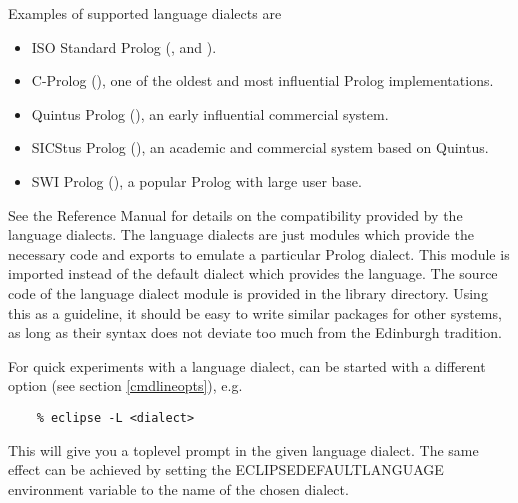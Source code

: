Examples of supported language dialects are
\begin{itemize}
\item ISO Standard Prolog
    (,
     and
    ).
\item C-Prolog (), one
    of the oldest and most influential Prolog implementations.
\item Quintus Prolog (),
    an early influential commercial system.
\item SICStus Prolog (),
    an academic and commercial system based on Quintus.
\item SWI Prolog (),
    a popular Prolog with large user base. 
\end{itemize}
See the Reference Manual for details on the compatibility provided by the
language dialects.
The language dialects are just modules which provide the necessary code
and exports  to emulate a particular Prolog dialect. This module is imported
instead of the default  dialect which provides the
{\eclipse} language.
The source code of the language dialect module is provided in the
{\eclipse} library directory.
Using this as a guideline, it should be easy to write similar packages for
other systems, as long as their syntax does not deviate too much
from the Edinburgh tradition.

For quick experiments with a language dialect, {\eclipse} can be started
with a different  option
(see section \ref{cmdlineopts}), e.g.
\begin{verbatim}
    % eclipse -L <dialect>
\end{verbatim}
This will give you a toplevel prompt in the given language dialect.
The same effect can be achieved by setting the ECLIPSEDEFAULTLANGUAGE
environment variable to the name of the chosen dialect.


